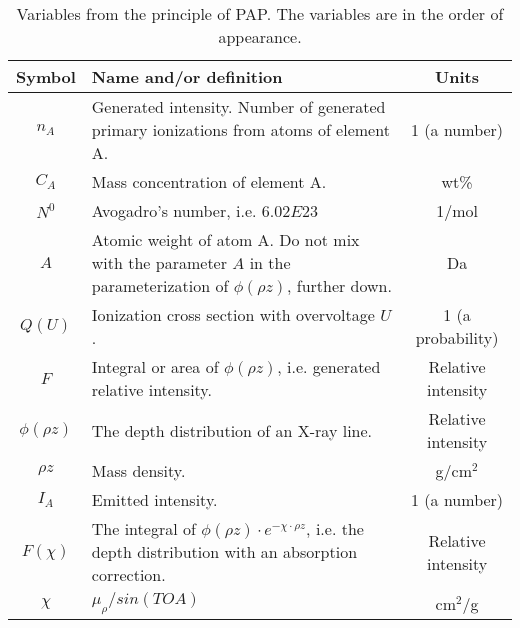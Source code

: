\begin{table}[phtb]
    \begin{center}
        \caption{
            Variables from the principle of PAP.
            The variables are in the order of appearance.
        }
        \label{tab:quantitative:PAP:variables:principle}
        \begin{tabular}{cp{9cm}c}
            \hline
            \textbf{Symbol} & \textbf{Name and/or definition}                                                                                          & \textbf{Units}     \\

            \hline
            $n_A$           & Generated intensity. Number of generated primary ionizations from atoms of element A.                                    & 1 (a number)       \\
            $C_A$           & Mass concentration of element A.                                                                                         & wt\%               \\
            $N^0$           & Avogadro's number, i.e. $6.02E23$                                                                                        & 1/mol              \\
            $A$             & Atomic weight of atom A. Do not mix with the parameter $A$ in the parameterization of $\phi(\rho z)$, further down.      & Da                 \\
            $Q(U)$          & Ionization cross section with overvoltage $U$.                                                                           & 1 (a probability)  \\
            $F$             & Integral or area of $\phi(\rho z)$, i.e. generated relative intensity.                                                   & Relative intensity \\
            $\phi(\rho z)$  & The depth distribution of an X-ray line.                                                                                 & Relative intensity \\
            $\rho z$        & Mass density.                                                                                                            & g/cm$^2$           \\
            $I_A$           & Emitted intensity.                                                                                                       & 1 (a number)       \\
            $F(\chi)$       & The integral of $\phi (\rho z) \cdot e^{-\chi \cdot \rho z}$, i.e. the depth distribution with an absorption correction. & Relative intensity \\
            $\chi$          & $ \mu_\rho / sin(TOA) $                                                                                                  & cm$^2$/g           \\
            \hline
        \end{tabular}
    \end{center}
\end{table}
